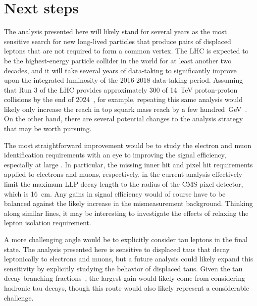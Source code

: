 \section{Next steps}
\label{next_steps}
The analysis presented here will likely stand for several years as the most sensitive search for new long-lived particles that produce pairs of displaced leptons that are not required to form a common vertex. The LHC is expected to be the highest-energy particle collider in the world for at least another two decades, and it will take several years of data-taking to significantly improve upon the integrated luminosity of the 2016-2018 data-taking period. Assuming that Run 3 of the LHC provides approximately \SI{300}{\fbinv} of \SI{14}{\TeV} proton-proton collisions by the end of 2024~\cite{run3_constraints, lhc_schedule}, for example, repeating this same analysis would likely only increase the reach in top squark mass reach by a few hundred~\si{\GeV}~\cite{collider_reach}. On the other hand, there are several potential changes to the analysis strategy that may be worth pursuing.

The most straightforward improvement would be to study the electron and muon identification requirements with an eye to improving the signal efficiency, especially at large \ad. In particular, the missing inner hit and pixel hit requirements applied to electrons and muons, respectively, in the current analysis effectively limit the maximum LLP decay length to the radius of the CMS pixel detector, which is \SI{16}{\cm}. Any gains in signal efficiency would of course have to be balanced against the likely increase in the mismeasurement background. Thinking along similar lines, it may be interesting to investigate the effects of relaxing the lepton isolation requirement.

A more challenging angle would be to explicitly consider tau leptons in the final state. The analysis presented here is sensitive to displaced taus that decay leptonically to electrons and muons, but a future analysis could likely expand this sensitivity by explicitly studying the \ad behavior of displaced taus. Given the tau decay branching fractions~\cite{pdg_2020}, the largest gain would likely come from considering hadronic tau decays, though this route would also likely represent a considerable challenge.

